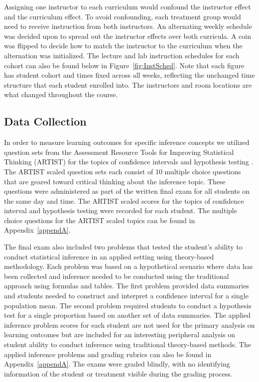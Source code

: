 \documentclass[11pt]{isuthesis}\usepackage[]{graphicx}\usepackage[]{color}
\begin{document}
Assigning one instructor to each curriculum would confound the instructor effect and the curriculum effect.  To avoid confounding, each treatment group would need to receive instruction from both instructors.  An alternating weekly schedule was decided upon to spread out the instructor effects over both curricula. A coin was flipped to decide how to match the instructor to the curriculum when the alternation was initialized. The lecture and lab instruction schedules for each cohort can also be found below in Figure~\ref{fig:InstSched}. Note that each figure has student cohort and times fixed across all weeks, reflecting the unchanged time structure that each student enrolled into. The instructors and room locations are what changed throughout the course. 

\subsection{Data Collection}
\label{datacollect}

In order to measure learning outcomes for specific inference concepts we utilized question sets from the Assessment Resource Tools for Improving Statistical Thinking (ARTIST) for the topics of confidence intervals and hypothesis testing \citep{ARTIST}.  The ARTIST scaled question sets each consist of 10 multiple choice questions that are geared toward critical thinking about the inference topic.  These questions were administered as part of the written final exam for all students on the same day and time. The ARTIST scaled scores for the topics of confidence interval and hypothesis testing were recorded for each student. The multiple choice questions for the ARTIST scaled topics can be found in Appendix~\ref{appendA}.

The final exam also included two problems that tested the student's ability to conduct statistical inference in an applied setting using theory-based methodology. Each problem was based on a hypothetical scenario where data has been collected and inference needed to be conducted using the traditional approach using formulas and tables. The first problem provided data summaries and students needed to construct and interpret a confidence interval for a single population mean. The second problem required students to conduct a hypothesis test for a single proportion based on another set of data summaries. The applied inference problem scores for each student are not used for the primary analysis on learning outcomes but are included for an interesting peripheral analysis on student ability to conduct inference using traditional theory-based methods. The applied inference problems and grading rubrics can also be found in Appendix~\ref{appendA}. The exams were graded blindly, with no identifying information of the student or treatment visible during the grading process.
\end{document}
